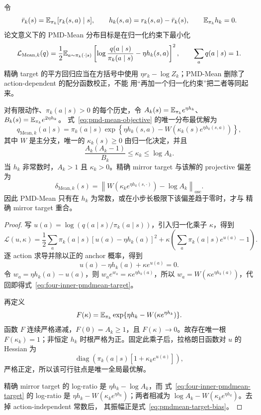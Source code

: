 令
\[
 \bar r_k(s)=\mathbb{E}_{\pi_k}[r_k(s,a)\mid s],\qquad
 h_k(s,a)=r_k(s,a)-\bar r_k(s),\qquad \mathbb{E}_{\pi_k}h_k=0.
\]
论文意义下的 PMD-Mean 分布目标是在归一化约束下最小化
\begin{equation}
\label{eq:pmd-mean-objective}
 \mathcal L_{\mathrm{Mean},k}(q)
 =\frac12\mathbb{E}_{a\sim\pi_k(\cdot\mid s)}
 \left[\log\frac{q(a\mid s)}{\pi_k(a\mid s)}-\eta h_k(s,a)\right]^2,
 \qquad \sum_aq(a\mid s)=1.
\end{equation}
精确 target 的平方回归应当在方括号中使用
$\eta r_k-\log Z_k$；PMD-Mean 删除了 action-dependent 的配分函数校正，不能
用“再加一个归一化约束”把二者等同起来。

\begin{theorem}
\label{thm:four-inner-pmdmean-lambert}
对有限动作、$\pi_k(a\mid s)>0$ 的每个历史，令
$A_k(s)=\mathbb{E}_{\pi_k}e^{\eta h_k}$、$B_k(s)=\mathbb{E}_{\pi_k}e^{2\eta h_k}$。
式~\eqref{eq:pmd-mean-objective} 的唯一分布最优解为
\begin{equation}
\label{eq:four-inner-pmdmean-target}
 q_{\mathrm{Mean},k}(a\mid s)
 =\pi_k(a\mid s)
 \exp\!\left\{\eta h_k(s,a)-W\!\left(\kappa_k(s)e^{\eta h_k(s,a)}\right)\right\},
\end{equation}
其中 $W$ 是主分支，唯一的 $\kappa_k(s)\ge0$ 由归一化决定，并且
\[
 \frac{A_k(A_k-1)}{B_k}\leq\kappa_k\leq\log A_k.
\]
当 $h_k$ 非常数时，$A_k>1$ 且 $\kappa_k>0$。精确 mirror target 与该解的
projective 偏差为
\begin{equation}
\label{eq:pmdmean-target-bias}
 \delta_{\mathrm{Mean},k}(s)
 =\left\|W\!\left(\kappa_ke^{\eta h_k(s,\cdot)}\right)-\log A_k\right\|_{\mathrm{osc}}.
\end{equation}
因此 PMD-Mean 只有在 $h_k$ 为常数，或在小步长极限下该偏差趋于零时，才与
精确 mirror target 重合。
\end{theorem}

\begin{proof}
写 $u(a)=\log(q(a\mid s)/\pi_k(a\mid s))$，引入归一化乘子 $\kappa$，得到
\[
 \mathscr L(u,\kappa)=\frac12\sum_a\pi_k(a\mid s)[u(a)-\eta h_k(a)]^2
 +\kappa\left(\sum_a\pi_k(a\mid s)e^{u(a)}-1\right).
\]
逐 action 求导并除以正的 anchor 概率，得到
\[
 u(a)-\eta h_k(a)+\kappa e^{u(a)}=0.
\]
令 $w_a=\eta h_k(a)-u(a)$，则
$w_ae^{w_a}=\kappa e^{\eta h_k(a)}$，所以
$w_a=W(\kappa e^{\eta h_k(a)})$，代回即得式~\eqref{eq:four-inner-pmdmean-target}。

再定义
\[
 F(\kappa)=\mathbb{E}_{\pi_k}\exp\{\eta h_k-W(\kappa e^{\eta h_k})\}.
\]
函数 $F$ 连续严格递减，$F(0)=A_k\ge1$，且
$F(\kappa)\to0$。故存在唯一根 $F(\kappa_k)=1$；非恒定 $h_k$
时根严格为正。固定此乘子后，拉格朗日函数对 $u$ 的 Hessian 为
\[
 \operatorname{diag}\left(\pi_k(a\mid s)[1+\kappa_ke^{u(a)}]\right),
\]
严格正定，所以该可行驻点是唯一全局最优解。

精确 mirror target 的 log-ratio 是 $\eta h_k-\log A_k$，而
式~\eqref{eq:four-inner-pmdmean-target} 的 log-ratio 是
$\eta h_k-W(\kappa_ke^{\eta h_k})$；两者相减为
$\log A_k-W(\kappa_ke^{\eta h_k})$。去掉 action-independent 常数后，
其振幅正是式~\eqref{eq:pmdmean-target-bias}。
\end{proof}

